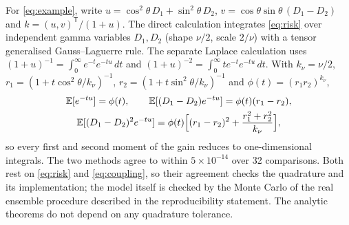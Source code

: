 \documentclass[11pt,a4paper]{article}
\numberwithin{equation}{section}
\theoremstyle{remark}\newtheorem{remark}[theorem]{Remark}
\newcommand{\E}{\mathbb E}
\newcommand{\T}{^{\mathsf T}}
\begin{document}
For \eqref{eq:example}, write \(u=\cos^2\!\theta\,D_1+\sin^2\!\theta\,D_2\),
\(v=\cos\theta\sin\theta\,(D_1-D_2)\) and \(k=(u,v)\T/(1+u)\). The direct calculation integrates
\eqref{eq:risk} over independent gamma variables \(D_1,D_2\) (shape \(\nu/2\), scale \(2/\nu\)) with a
tensor generalised Gauss--Laguerre rule. The separate Laplace calculation uses
\((1+u)^{-1}=\int_0^\infty e^{-t}e^{-tu}\,dt\) and \((1+u)^{-2}=\int_0^\infty te^{-t}e^{-tu}\,dt\).
With \(k_\nu=\nu/2\),
\(r_1=(1+t\cos^2\!\theta/k_\nu)^{-1}\), \(r_2=(1+t\sin^2\!\theta/k_\nu)^{-1}\) and
\(\phi(t)=(r_1r_2)^{k_\nu}\),
\begin{gather*}
 \E[e^{-tu}]=\phi(t),\qquad \E[(D_1-D_2)e^{-tu}]=\phi(t)(r_1-r_2),\\
 \E[(D_1-D_2)^2e^{-tu}]=\phi(t)\Bigl[(r_1-r_2)^2+\frac{r_1^2+r_2^2}{k_\nu}\Bigr],
\end{gather*}
so every first and second moment of the gain reduces to one-dimensional integrals. The two
methods agree to within \(5\times10^{-14}\) over 32 comparisons. Both rest on \eqref{eq:risk} and
\eqref{eq:coupling}, so their agreement checks the quadrature and its implementation; the model
itself is checked by the Monte Carlo of the real ensemble procedure described in the
reproducibility statement. The analytic theorems do not depend on any quadrature tolerance.



\end{document}
